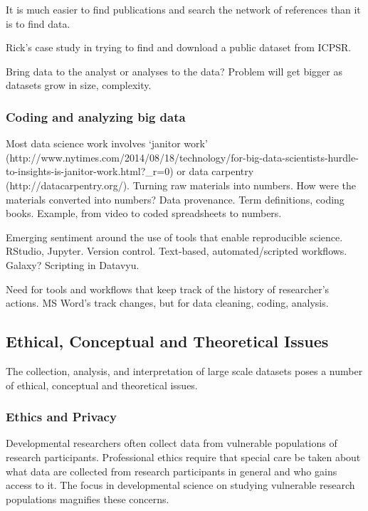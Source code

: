 \documentclass[letterpaper,man,apacite]{apa6}
\begin{document}
It is much easier to find publications and search the network of references than it is to find data.

Rick's case study in trying to find and download a public dataset from ICPSR.

Bring data to the analyst or analyses to the data?
Problem will get bigger as datasets grow in size, complexity.

\subsubsection{Coding and analyzing big data}

Most data science work involves `janitor work' (http://www.nytimes.com/2014/08/18/technology/for-big-data-scientists-hurdle-to-insights-is-janitor-work.html?_r=0) or data carpentry (http://datacarpentry.org/).
Turning raw materials into numbers.
How were the materials converted into numbers?
Data provenance.
Term definitions, coding books.
Example, from video to coded spreadsheets to numbers.

Emerging sentiment around the use of tools that enable reproducible science.
RStudio, Jupyter.
Version control.
Text-based, automated/scripted workflows. Galaxy?
Scripting in Datavyu.

Need for tools and workflows that keep track of the history of researcher's actions.
MS Word's track changes, but for data cleaning, coding, analysis.

\subsection{Ethical, Conceptual and Theoretical Issues}

The collection, analysis, and interpretation of large scale datasets poses a number of ethical, conceptual and theoretical issues.

\subsubsection{Ethics and Privacy}

Developmental researchers often collect data from vulnerable populations of research participants.
Professional ethics require that special care be taken about what data are collected from research participants in general and who gains access to it.
The focus in developmental science on studying vulnerable research populations magnifies these concerns.
\end{document}

